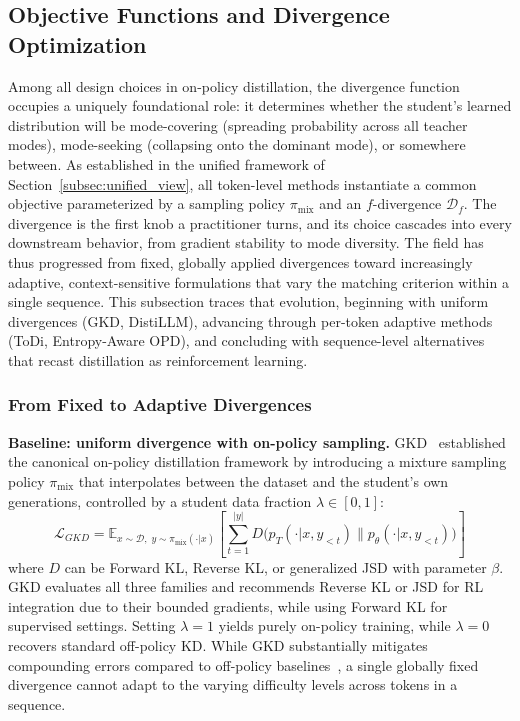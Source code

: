 \documentclass{article} %
\newcommand{\ptheta}{p_\theta}
\newcommand{\pteacher}{p_T}
\begin{document}
\subsection{Objective Functions and Divergence Optimization}
\label{subsec:divergence}

Among all design choices in on-policy distillation, the divergence function occupies a uniquely foundational role: it determines whether the student's learned distribution will be mode-covering (spreading probability across all teacher modes), mode-seeking (collapsing onto the dominant mode), or somewhere between. As established in the unified framework of Section~\ref{subsec:unified_view}, all token-level methods instantiate a common objective parameterized by a sampling policy $\pi_{\mathrm{mix}}$ and an $f$-divergence $\mathcal{D}_f$. The divergence is the first knob a practitioner turns, and its choice cascades into every downstream behavior, from gradient stability to mode diversity. The field has thus progressed from fixed, globally applied divergences toward increasingly adaptive, context-sensitive formulations that vary the matching criterion within a single sequence. This subsection traces that evolution, beginning with uniform divergences (GKD, DistiLLM), advancing through per-token adaptive methods (ToDi, Entropy-Aware OPD), and concluding with sequence-level alternatives that recast distillation as reinforcement learning.

\subsubsection{From Fixed to Adaptive Divergences}

\textbf{Baseline: uniform divergence with on-policy sampling.}
GKD~\citep{2306.13649} established the canonical on-policy distillation framework by introducing a mixture sampling policy $\pi_{\mathrm{mix}}$ that interpolates between the dataset and the student's own generations, controlled by a student data fraction $\lambda \in [0,1]$:
\begin{equation}
    \mathcal{L}_{GKD} = \mathbb{E}_{x \sim \mathcal{D},\; y \sim \pi_{\mathrm{mix}}(\cdot|x)} \left[ \sum_{t=1}^{|y|} D\big( \pteacher(\cdot|x, y_{<t}) \parallel \ptheta(\cdot|x, y_{<t}) \big) \right]
    \label{eq:gkd}
\end{equation}
where $D$ can be Forward KL, Reverse KL, or generalized JSD with parameter $\beta$. GKD evaluates all three families and recommends Reverse KL or JSD for RL integration due to their bounded gradients, while using Forward KL for supervised settings. Setting $\lambda=1$ yields purely on-policy training, while $\lambda=0$ recovers standard off-policy KD. While GKD substantially mitigates compounding errors compared to off-policy baselines~\citep{2306.13649}, a single globally fixed divergence cannot adapt to the varying difficulty levels across tokens in a sequence.
\end{document}
